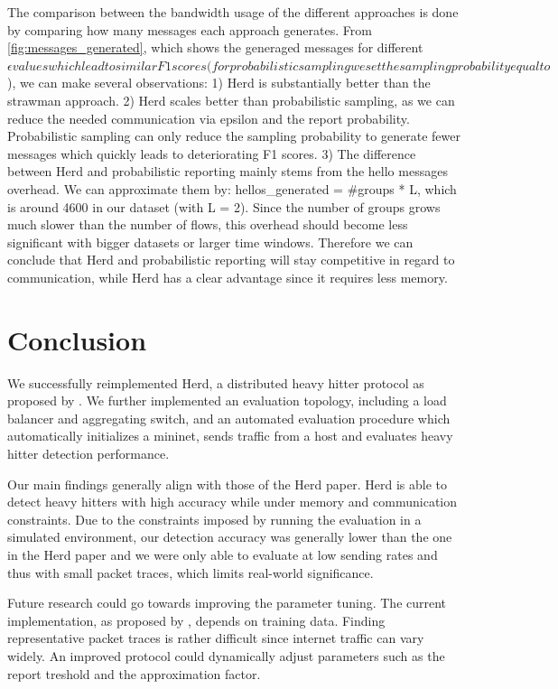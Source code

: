 \documentclass[11pt,oneside,a4paper]{article}
\begin{document}
The comparison between the bandwidth usage of the different approaches is done by comparing how many messages each approach generates. From \ref{fig:messages_generated}, which shows the generaged messages for different $\epsilon values which lead to similar F1 scores (for probabilistic sampling we set the sampling probability equal to $\epsilon), we can make several observations:
1) Herd is substantially better than the strawman approach.
2) Herd scales better than probabilistic sampling, as we can reduce the needed communication via epsilon and the report probability. Probabilistic sampling can only reduce the sampling probability to generate fewer messages which quickly leads to deteriorating F1 scores.
3) The difference between Herd and probabilistic reporting mainly stems from the hello messages overhead. We can approximate them by: hellos_generated = #groups * L, which is around 4600 in our dataset (with L = 2). Since the number of groups grows much slower than the number of flows, this overhead should become less significant with bigger datasets or larger time windows. Therefore we can conclude that Herd and probabilistic reporting will stay competitive in regard to communication, while Herd has a clear advantage since it requires less memory.

\section{Conclusion}


We successfully reimplemented Herd, a distributed heavy hitter protocol as proposed by \cite{anon2019herd}. We further implemented an evaluation topology, including a load balancer and aggregating switch, and an automated evaluation procedure which automatically initializes a mininet, sends traffic from a host and evaluates heavy hitter detection performance.

\noindent Our main findings generally align with those of the Herd paper. Herd is able to detect heavy hitters with high accuracy while under memory and communication constraints. Due to the constraints imposed by running the evaluation in a simulated environment, our detection accuracy was generally lower than the one in the Herd paper and we were only able to evaluate at low sending rates and thus with small packet traces, which limits  real-world significance.

Future research could go towards improving the parameter tuning. The current implementation, as proposed by \cite{anon2019herd}, depends on training data. Finding representative packet traces is rather difficult since internet traffic can vary widely. An improved protocol could dynamically adjust parameters such as the report treshold and the approximation factor.
\end{document}
